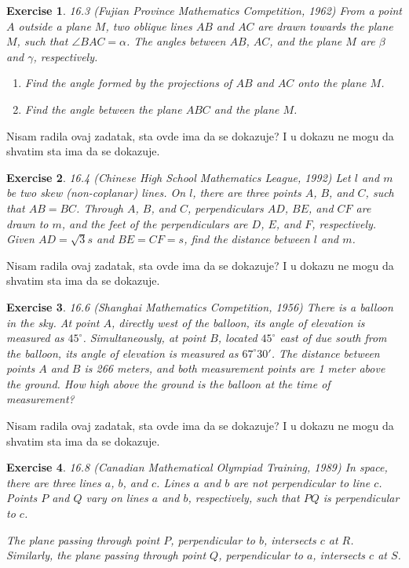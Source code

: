 \documentclass{article}
\newtheorem{z}{Exercise}
\begin{document}
    \begin{z} \textup{16.3 (Fujian Province Mathematics Competition, 1962)}
        From a point $A$ outside a plane $M$, two oblique lines $AB$ and $AC$ are drawn towards the plane $M$, such that $\angle BAC = \alpha$. The angles between $AB$, $AC$, and the plane $M$ are $\beta$ and $\gamma$, respectively.

        \begin{enumerate}
            \item Find the angle formed by the projections of $AB$ and $AC$ onto the plane $M$.
            \item Find the angle between the plane $ABC$ and the plane $M$.
        \end{enumerate}
    \end{z}

    Nisam radila ovaj zadatak, sta ovde ima da se dokazuje? I u dokazu ne mogu da shvatim sta ima da se dokazuje.

    \begin{z} \textup{16.4 (Chinese High School Mathematics League, 1992)}
        Let $l$ and $m$ be two skew (non-coplanar) lines. On $l$, there are three points $A$, $B$, and $C$, such that $AB = BC$. Through $A$, $B$, and $C$, perpendiculars $AD$, $BE$, and $CF$ are drawn to $m$, and the feet of the perpendiculars are $D$, $E$, and $F$, respectively. Given $AD = \sqrt{3}s$ and $BE = CF = s$, find the distance between $l$ and $m$.
    \end{z}

    Nisam radila ovaj zadatak, sta ovde ima da se dokazuje? I u dokazu ne mogu da shvatim sta ima da se dokazuje.

    \begin{z} \textup{16.6 (Shanghai Mathematics Competition, 1956)}        
        There is a balloon in the sky. At point $A$, directly west of the balloon, its angle of elevation is measured as $45^\circ$. Simultaneously, at point $B$, located $45^\circ$ east of due south from the balloon, its angle of elevation is measured as $67^\circ 30'$. The distance between points $A$ and $B$ is 266 meters, and both measurement points are 1 meter above the ground. How high above the ground is the balloon at the time of measurement?
    \end{z}

    Nisam radila ovaj zadatak, sta ovde ima da se dokazuje? I u dokazu ne mogu da shvatim sta ima da se dokazuje.

    \begin{z} \textup{16.8 (Canadian Mathematical Olympiad Training, 1989)}
        In space, there are three lines $a$, $b$, and $c$. Lines $a$ and $b$ are not perpendicular to line $c$. Points $P$ and $Q$ vary on lines $a$ and $b$, respectively, such that $PQ$ is perpendicular to $c$. 

        The plane passing through point $P$, perpendicular to $b$, intersects $c$ at $R$. Similarly, the plane passing through point $Q$, perpendicular to $a$, intersects $c$ at $S$. 
    \end{z}
\end{document}
